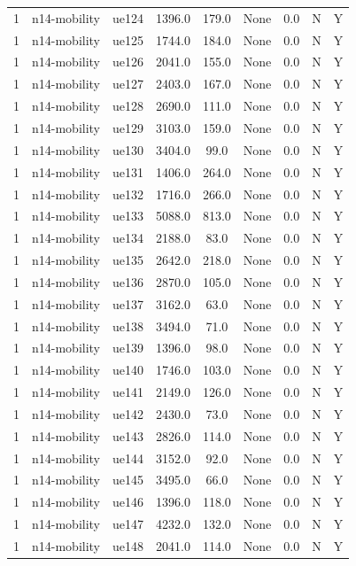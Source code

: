 \begin{table}[ht]
\begin{tabular}{|c|c|c|c|c|c|c|c|c|}
1 & n14-mobility & ue124 & 1396.0 & 179.0 & None & 0.0 & N & Y \\
1 & n14-mobility & ue125 & 1744.0 & 184.0 & None & 0.0 & N & Y \\
1 & n14-mobility & ue126 & 2041.0 & 155.0 & None & 0.0 & N & Y \\
1 & n14-mobility & ue127 & 2403.0 & 167.0 & None & 0.0 & N & Y \\
1 & n14-mobility & ue128 & 2690.0 & 111.0 & None & 0.0 & N & Y \\
1 & n14-mobility & ue129 & 3103.0 & 159.0 & None & 0.0 & N & Y \\
1 & n14-mobility & ue130 & 3404.0 & 99.0 & None & 0.0 & N & Y \\
1 & n14-mobility & ue131 & 1406.0 & 264.0 & None & 0.0 & N & Y \\
1 & n14-mobility & ue132 & 1716.0 & 266.0 & None & 0.0 & N & Y \\
1 & n14-mobility & ue133 & 5088.0 & 813.0 & None & 0.0 & N & Y \\
1 & n14-mobility & ue134 & 2188.0 & 83.0 & None & 0.0 & N & Y \\
1 & n14-mobility & ue135 & 2642.0 & 218.0 & None & 0.0 & N & Y \\
1 & n14-mobility & ue136 & 2870.0 & 105.0 & None & 0.0 & N & Y \\
1 & n14-mobility & ue137 & 3162.0 & 63.0 & None & 0.0 & N & Y \\
1 & n14-mobility & ue138 & 3494.0 & 71.0 & None & 0.0 & N & Y \\
1 & n14-mobility & ue139 & 1396.0 & 98.0 & None & 0.0 & N & Y \\
1 & n14-mobility & ue140 & 1746.0 & 103.0 & None & 0.0 & N & Y \\
1 & n14-mobility & ue141 & 2149.0 & 126.0 & None & 0.0 & N & Y \\
1 & n14-mobility & ue142 & 2430.0 & 73.0 & None & 0.0 & N & Y \\
1 & n14-mobility & ue143 & 2826.0 & 114.0 & None & 0.0 & N & Y \\
1 & n14-mobility & ue144 & 3152.0 & 92.0 & None & 0.0 & N & Y \\
1 & n14-mobility & ue145 & 3495.0 & 66.0 & None & 0.0 & N & Y \\
1 & n14-mobility & ue146 & 1396.0 & 118.0 & None & 0.0 & N & Y \\
1 & n14-mobility & ue147 & 4232.0 & 132.0 & None & 0.0 & N & Y \\
1 & n14-mobility & ue148 & 2041.0 & 114.0 & None & 0.0 & N & Y \\

\end{tabular}
\end{table}

